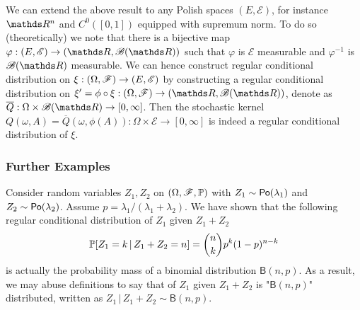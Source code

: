 \begin{unexaminable}
\begin{remark}
We can extend the above result to any Polish spaces $(E,\mathcal{E})$, for instance $\R^n$ and $C^0([0,1])$ equipped with supremum norm. To do so (theoretically) we note that there is a bijective map $\varphi:(E,\mathcal{E}) \to (\R,\B(\R))$ such that $\varphi$ is $\mathcal{E}$ measurable and $\varphi^{-1}$ is $\B(\R)$ measurable. We can hence construct regular conditional distribution on $\xi:(\Omega,\mathcal{F}) \to (E,\mathcal{E})$ by constructing a regular conditional distribution on $\xi' = \phi \circ \xi: (\Omega,\F) \to (\R,\B(\R))$, denote as $\overline{Q}:\Omega \times \B(\R) \to [0,\infty]$. Then the stochastic kernel $Q(\omega,A) = \overline{Q}(\omega,\phi(A)) : \Omega \times \mathcal{E} \to [0,\infty]$ is indeed a regular conditional distribution of $\xi$.
\end{remark}

\subsubsection{Further Examples}

\begin{example}
 Consider random variables $Z_1, Z_2$ on $(\Omega,\mathcal{F},\mathbb{P})$ with $Z_1 \sim \mathsf{Po}(\lambda_1)$ and $Z_2 \sim \mathsf{Po}(\lambda_2)$. Assume $p = \lambda_1/(\lambda_1+\lambda_2)$. We have shown that the following regular conditional distribution of $Z_1$ given $Z_1 + Z_2$
\begin{equation}
    \mathbb{P}[Z_1 = k \,|\, Z_1 + Z_2 = n] = {n \choose k} p^k (1-p)^{n-k}
\end{equation}
is actually the probability mass of a binomial distribution $\mathsf{B}(n,p)$. As a result, we may abuse definitions to say that of $Z_1$ given $Z_1 + Z_2$ is "$\mathsf{B}(n,p)$" distributed, written as $Z_1 \,|\, Z_1 + Z_2 \sim \mathsf{B}(n,p)$.
\end{example}


\end{unexaminable}

